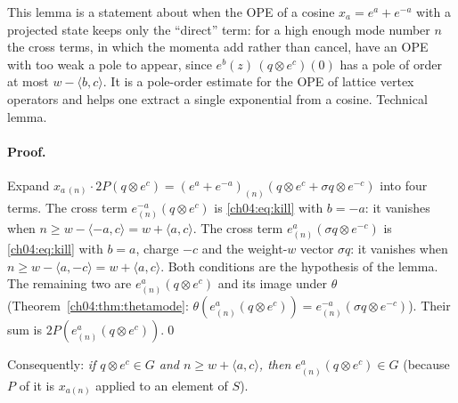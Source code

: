 \begin{physics}
This lemma is a statement about when the OPE of a cosine $x_a=e^a+e^{-a}$ with a projected state keeps only the ``direct'' term: for a high enough mode number $n$ the cross terms, in which the momenta add rather than cancel, have an OPE with too weak a pole to appear, since $e^b(z)\,(q\otimes e^c)(0)$ has a pole of order at most $w-\langle b,c\rangle$. It is a pole-order estimate for the OPE of lattice vertex operators and helps one extract a single exponential from a cosine. Technical lemma.
\end{physics}

\paragraph{Proof.} Expand $x_{a\,(n)}\cdot2P(q\otimes e^c)=(e^a+e^{-a})_{(n)}(q\otimes e^c+\sigma q\otimes
e^{-c})$ into four terms. The cross term $e^{-a}_{(n)}(q\otimes e^c)$ is \eqref{ch04:eq:kill} with
$b=-a$: it vanishes when $n\ge w-\langle -a,c\rangle=w+\langle a,c\rangle$. The cross term
$e^{a}_{(n)}(\sigma q\otimes e^{-c})$ is \eqref{ch04:eq:kill} with $b=a$, charge $-c$ and the
weight-$w$ vector $\sigma q$: it vanishes when $n\ge w-\langle a,-c\rangle=w+\langle a,c\rangle$. Both
conditions are the hypothesis of the lemma. The remaining two are
$e^a_{(n)}(q\otimes e^c)$ and its image under $\theta$ (Theorem~\ref{ch04:thm:thetamode}:
$\theta(e^a_{(n)}(q\otimes e^c))=e^{-a}_{(n)}(\sigma q\otimes e^{-c})$). Their sum is
$2P(e^a_{(n)}(q\otimes e^c))$.\qed

Consequently: \emph{if $q\otimes e^c\in G$ and $n\ge w+\langle a,c\rangle$, then
$e^a_{(n)}(q\otimes e^c)\in G$} (because $P$ of it is $x_{a(n)}$ applied to an element of $S$).

